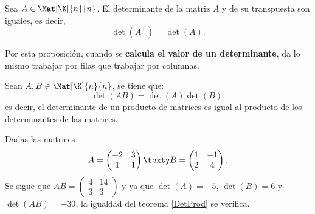 \documentclass[compacto,10pt]{pubciencias-notas}
\begin{document}

\begin{prop}
    Sea $A \in \Mat[\K]{n}{n}$. El determinante de la matriz $A$ y de su transpuesta son iguales, es decir, 
    \[
        \det(A^\intercal) = \det(A).
    \]
\end{prop}

\begin{obs}
    Por esta proposición, cuando se \textbf{calcula el valor de un determinante}, da lo mismo trabajar por filas que trabajar por columnas.
\end{obs}

\begin{teo}\label{DetProd}
    Sean $A, B\in \Mat[\K]{n}{n}$, se tiene que:
    \[
        \det(AB) = \det(A)\det(B).
    \]
    es decir, el determinante de un producto de matrices es igual al producto de los determinantes de las matrices.
\end{teo}

\begin{ejem} Dadas las matrices 
\[
A = 
    \begin{pmatrix}
        -2 & 3 \\
        1 & 1
    \end{pmatrix}
\texty
B=
    \begin{pmatrix}
        1 & -1 \\
        2 & 4
    \end{pmatrix}.
\]
Se sigue que $AB = 
    \begin{pmatrix}
        4 & 14 \\
        3 & 3
    \end{pmatrix}$ y ya que $\det(A) = -5$, $\det(B) = 6$ y $\det(AB) = -30$, la igualdad del teorema \ref{DetProd} se verifica.
\end{ejem}
\end{document}
